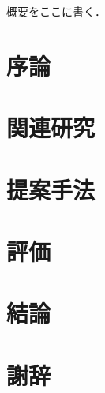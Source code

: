 \documentclass[a4paper,12pt]{jsarticle}
\date{平成xx年3月}
\begin{document}
\Front %
\MakeTitlePage

\begin{Abstract}
概要をここに書く．
\end{Abstract}

\TableOfContents

\Main %

\section{序論}

\section{関連研究}

\section{提案手法}

\section{評価}

\section{結論}

\section*{謝辞}

\begin{thebibliography}{99}

\end{thebibliography}
\end{document}

